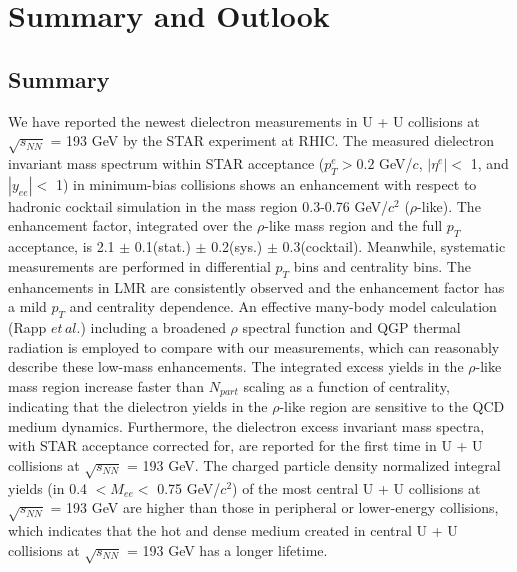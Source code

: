 ﻿\chapter{Summary and Outlook}
\label{chap:outlook}

\section{Summary}
We have reported the newest dielectron measurements in U + U collisions at $\sqrt{s_{NN}}$ = 193 GeV by the STAR experiment at RHIC. The measured dielectron invariant mass spectrum within STAR acceptance ($p_{T}^{e}>0.2$ GeV/$c$, $|\eta^{e}|<$ 1, and $|y_{ee}|<$ 1) in minimum-bias collisions shows an enhancement with respect to hadronic cocktail simulation in the mass region 0.3-0.76 GeV/$c^{2}$ ($\rho$-like). The enhancement factor, integrated over the $\rho$-like mass region and the full $p_{T}$ acceptance, is 2.1 $\pm$ 0.1(stat.) $\pm$ 0.2(sys.) $\pm$ 0.3(cocktail). Meanwhile, systematic measurements are performed in differential $p_{T}$ bins and centrality bins. The enhancements in LMR are consistently observed and the enhancement factor has a mild $p_{T}$ and centrality dependence. An effective many-body model calculation (Rapp $et\,al.$) including a broadened $\rho$ spectral function and QGP thermal radiation is employed to compare with our measurements, which can reasonably describe these low-mass enhancements. The integrated excess yields in the $\rho$-like mass region increase faster than $N_{part}$ scaling as a function of centrality, indicating that the dielectron yields in the $\rho$-like region are sensitive to the QCD medium dynamics. Furthermore, the dielectron excess invariant mass spectra, with STAR acceptance corrected for, are reported for the first time in U + U collisions at $\sqrt{s_{NN}}$ = 193 GeV. The charged particle density normalized integral yields (in 0.4 $<M_{ee}<$ 0.75 GeV/$c^{2}$) of the most central U + U collisions at $\sqrt{s_{NN}}$ = 193 GeV are higher than those in peripheral or lower-energy collisions, which indicates that the hot and dense medium created in central U + U collisions at $\sqrt{s_{NN}}$ = 193 GeV has a longer lifetime.

